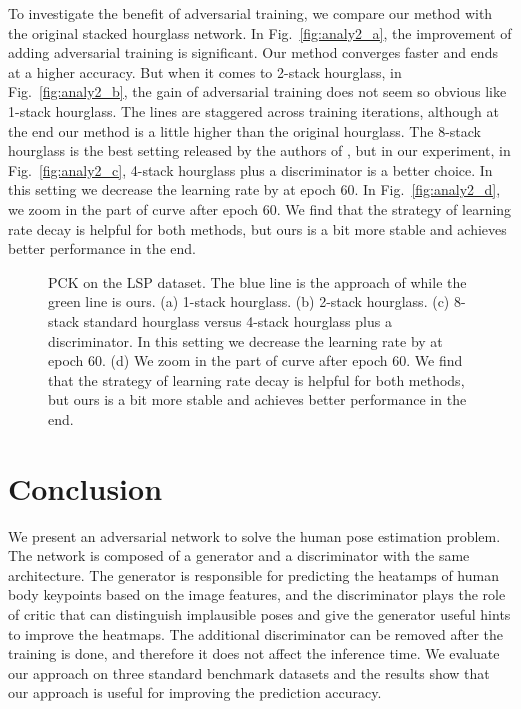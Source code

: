 \documentclass[10pt,twocolumn,letterpaper]{article}
\begin{document}
To investigate the benefit of adversarial training, we compare our method with the original stacked hourglass network. In Fig.~\ref{fig:analy2_a}, the improvement of adding adversarial training is significant. Our method converges faster and ends at a higher accuracy. But when it comes to 2-stack hourglass, in Fig.~\ref{fig:analy2_b}, the gain of adversarial training does not seem so obvious like 1-stack hourglass. The lines are staggered across training iterations, although at the end our method is a little higher than the original hourglass. The 8-stack hourglass is the best setting released by the authors of \cite{NewellYD16}, but in our experiment, in Fig.~\ref{fig:analy2_c}, 4-stack hourglass plus a discriminator is a better choice. In this setting we decrease the learning rate by  at epoch 60. In Fig.~\ref{fig:analy2_d}, we zoom in the part of curve after epoch 60. We find that the strategy of learning rate decay is helpful for both methods, but ours is a bit more stable and achieves better performance in the end.
\begin{figure*}[t]
\centering
    \caption{\label{fig:analy2} PCK on the LSP dataset. The blue line is the approach of \cite{NewellYD16} while the green line is ours.  (a) 1-stack hourglass. (b) 2-stack hourglass.
    (c) 8-stack standard hourglass versus 4-stack hourglass plus a discriminator. In this setting we decrease the learning rate by  at epoch 60. (d) We zoom in the part of curve after epoch 60. We find that the strategy of learning rate decay is helpful for both methods, but ours is a bit more stable and achieves better performance in the end.}
 \end{figure*}
 
 
\section{Conclusion}

We present an adversarial network to solve the human pose estimation problem. The network is composed of a generator and a discriminator with the same architecture. The generator is responsible for predicting the heatamps of human body keypoints based on the image features, and the discriminator plays the role of critic that can distinguish implausible poses and give the generator useful hints to improve the heatmaps. The additional discriminator can be removed after the training is done, and therefore it does not affect the inference time. We evaluate our approach on three standard benchmark datasets and the results show that our approach is useful for improving the prediction accuracy.



\end{document}
